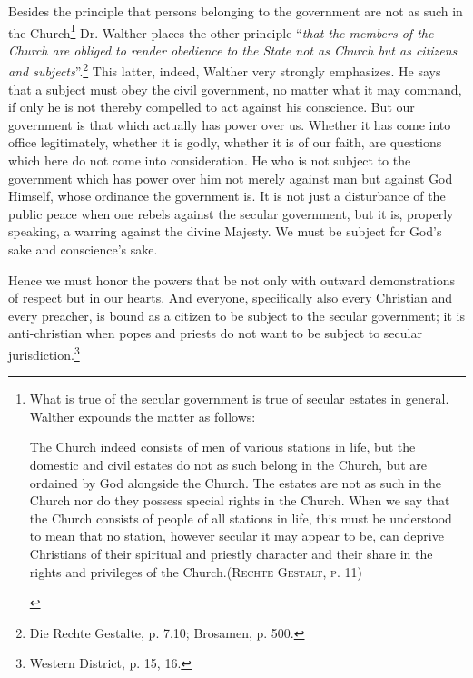                 Besides the principle that persons belonging to the government are not as such in the Church\footnote{What is true of the secular government is true of secular estates in general.  Walther expounds the matter as follows: \begin{displayquote}The Church indeed consists of men of various stations in life, but the domestic and civil estates do not as such belong in the Church, but are ordained by God alongside the Church.  The estates are not as such in the Church nor do they possess special rights in the Church.  When we say that the Church consists of people of all stations in life, this must be understood to mean that no station, however secular it may appear to be, can deprive Christians of their spiritual and priestly character and their share in the rights and privileges of the Church.{\scriptsize\textsc{(Rechte Gestalt, p. 11)}}\end{displayquote}}  Dr. Walther places the other principle “\textit{that the members of the Church are obliged to render obedience to the State not as Church but as citizens and subjects}''.\footnote{Die Rechte Gestalte, p. 7.10; Brosamen, p. 500.}  This latter, indeed, Walther very strongly emphasizes.  He says that a subject must obey the civil government, no matter what it may command, if only he is not thereby compelled to act against his conscience.  But our government is that which actually has power over us.  Whether it has come into office legitimately, whether it is godly, whether it is of our faith, are questions which here do not come into consideration.  He who is not subject to the government which has power over him not merely against man but against God Himself, whose ordinance the government is.  It is not just a disturbance of the public peace when one rebels against the secular government, but it is, properly speaking, a warring against the divine Majesty.  We must be subject for God’s sake and conscience’s sake.\par  Hence we must honor the powers that be not only with outward demonstrations of respect but in our hearts.  And everyone, specifically also every Christian and every preacher, is bound as a citizen to be subject to the secular government; it is anti-christian when popes and priests do not want to be subject to secular jurisdiction.\footnote{Western District, p. 15, 16.}
\divider
